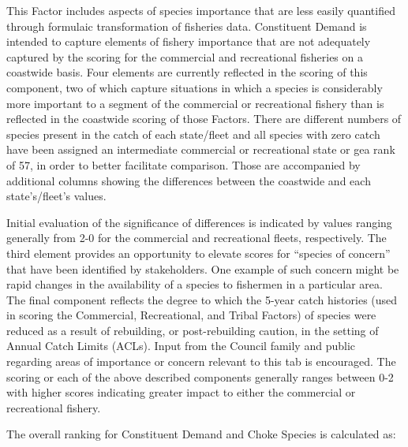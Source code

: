 \documentclass[11pt,
  english,
  a4paper,
]{article}
\begin{document}
This Factor includes aspects of species importance that are less easily quantified through formulaic transformation of fisheries data. Constituent Demand is intended to capture elements of fishery importance that are not adequately captured by the scoring for the commercial and recreational fisheries on a coastwide basis. Four elements are currently reflected in the scoring of this component, two of which capture situations in which a species is considerably more important to a segment of the commercial or recreational fishery than is reflected in the coastwide scoring of those Factors. There are different numbers of species present in the catch of each state/fleet and all species with zero catch have been assigned an intermediate commercial or recreational state or gea rank of 57, in order to better facilitate comparison. Those are accompanied by additional columns showing the differences between the coastwide and each state's/fleet's values.

\leavevmode\tagmcend\tagstructend\par


Initial evaluation of the significance of differences is indicated by values ranging generally from 2-0 for the commercial and recreational fleets, respectively. The third element provides an opportunity to elevate scores for ``species of concern'' that have been identified by stakeholders. One example of such concern might be rapid changes in the availability of a species to fishermen in a particular area. The final component reflects the degree to which the 5-year catch histories (used in scoring the Commercial, Recreational, and Tribal Factors) of species were reduced as a result of rebuilding, or post-rebuilding caution, in the setting of Annual Catch Limits (ACLs). Input from the Council family and public regarding areas of importance or concern relevant to this tab is encouraged. The scoring or each of the above described components generally ranges between 0-2 with higher scores indicating greater impact to either the commercial or recreational fishery.

\leavevmode\tagmcend\tagstructend\par


The overall ranking for Constituent Demand and Choke Species is calculated as:

\leavevmode\tagmcend\tagstructend\par
\end{document}
